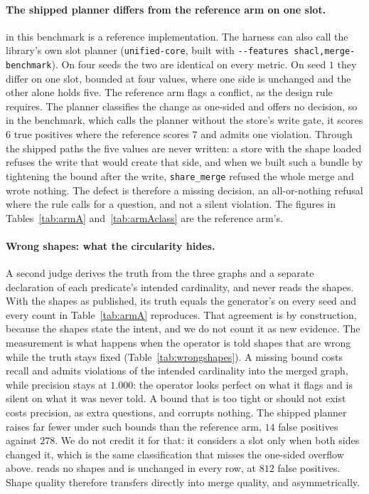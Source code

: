 \paragraph{The shipped planner differs from the reference arm on one slot.}
\op in this benchmark is a reference implementation. The harness can also call
the library's own slot planner (\texttt{unified-core}, built with
\texttt{-{}-features shacl,merge-benchmark}). On four seeds the two are
identical on every metric. On seed $1$ they differ on one slot, bounded at four
values, where one side is unchanged and the other alone holds five. The
reference arm flags a conflict, as the design rule requires. The planner
classifies the change as one-sided and offers no decision, so in the benchmark,
which calls the planner without the store's write gate, it scores $6$ true
positives where the reference scores $7$ and admits one violation. Through the
shipped paths the five values are never written: a store with the shape loaded
refuses the write that would create that side, and when we built such a bundle
by tightening the bound after the write, \texttt{share\_merge} refused the
whole merge and wrote nothing. The defect is therefore a missing decision, an
all-or-nothing refusal where the rule calls for a question, and not a silent
violation. The figures in Tables~\ref{tab:armA} and~\ref{tab:armAclass} are the
reference arm's.

\paragraph{Wrong shapes: what the circularity hides.} A second judge derives the truth from the three graphs
and a separate declaration of each predicate's intended cardinality, and never
reads the shapes. With the shapes as published, its truth equals the
generator's on every seed and every count in Table~\ref{tab:armA} reproduces.
That agreement is by construction, because the shapes state the intent, and we
do not count it as new evidence. The measurement is what happens when the
operator is told shapes that are wrong while the truth stays fixed
(Table~\ref{tab:wrongshapes}). A missing bound costs recall and admits
violations of the intended cardinality into the merged graph, while precision
stays at $1.000$: the operator looks perfect on what it flags and is silent on
what it was never told. A bound that is too tight or should not exist costs
precision, as extra questions, and corrupts nothing. The shipped planner
raises far fewer under such bounds than the reference arm, $14$ false
positives against $278$. We do not credit it for that: it considers a slot only
when both sides changed it, which is the same classification that misses the
one-sided overflow above. \ctx reads no shapes and is unchanged in every row, at $812$
false positives. Shape quality therefore transfers directly into merge quality,
and asymmetrically.

